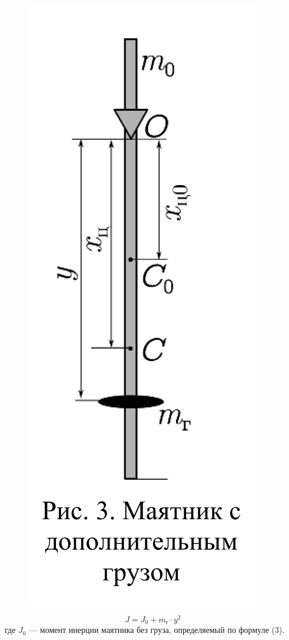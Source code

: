 \documentclass[a4paper,12pt]{article} %
\begin{document}
\begin{figure} [h]
\center
\includegraphics[scale = 0.3]{./141/pic3.png}
\end{figure}

\[J = J_0 + m_{\text{г}} \cdot y^2\]
где $J_0$ — момент инерции маятника без груза, определяемый по формуле (3).
\end{document}
